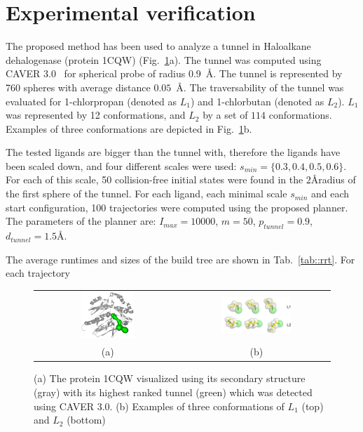 \documentclass{svmult}
\def\dt{d_{tunnel}}
\def\Imax{I_{max}} %
\def\smin{s_{min}}
\def\gb{p_{tunnel}}
\def\LA{L_1}
\def\LB{L_2}
\begin{document}
\section{Experimental verification}

The proposed method has been used to analyze a tunnel in Haloalkane dehalogenase (protein 1CQW) (Fig.~\ref{fig::tunnel}a).
The tunnel was computed using CAVER 3.0~\cite{caver3} for spherical probe of radius 0.9~\AA.
The tunnel is represented by 760 spheres with average distance $0.05$~\AA.
The traversability of the tunnel was evaluated for 1-chlorpropan (denoted as $\LA$) and 1-chlorbutan (denoted as $\LB$).
$\LA$ was represented by 12 conformations, and $\LB$ by a set of $114$ conformations.
Examples of three conformations are depicted in Fig.~\ref{fig::tunnel}b.

The tested ligands are bigger than the tunnel with, therefore the ligands have been scaled down, and four
different scales were used: $\smin=\{0.3,0.4,0.5,0.6\}$.
For each of this scale, 50 collision-free initial states were found in the $2$\AA radius of the first sphere of the tunnel.
For each ligand, each minimal scale $\smin$ and each start configuration, 100 trajectories were computed using the proposed planner.
The parameters of the planner are: $\Imax=10000$, $m=50$, $\gb=0.9$, $\dt=1.5$\AA.

The average runtimes and sizes of the build tree are shown in Tab.~\ref{tab::rrt}.
For each trajectory

\def\tmpa{0.13\textwidth}

\begin{figure}
\centering
\begin{tabular}{cc}
\includegraphics[width=0.38\textwidth]{fig/protein-tunnel-gray} &
\includegraphics[width=0.5\textwidth]{fig/ligAll}  \\
(a) & (b)                        
\end{tabular}                       
\caption{\label{fig::tunnel}
    (a) The protein 1CQW visualized using its secondary structure (gray) with its highest ranked tunnel (green) which was detected using CAVER 3.0.
    (b) Examples of three conformations of $\LA$ (top) and $\LB$ (bottom)
}
\end{figure}
\end{document}
